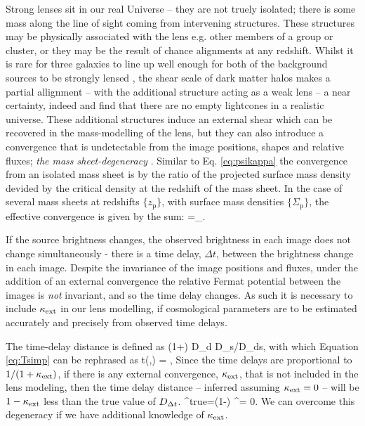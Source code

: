 \documentclass[useAMS,usenatbib]{mn2e}
\begin{document}
Strong lenses sit in our real Universe -- they are not truely isolated;
there is some mass along the line of sight coming from intervening structures.
These structures may be physically associated with the lens e.g. other members
of a group or cluster, or they may be the result of chance alignments at any redshift. 
Whilst it is rare for three galaxies to line up well enough for both of the background sources
to be strongly lensed \citep{gavazzi2008,collett2012}, the shear scale of dark matter halos
makes a partial allignment -- with the additional structure acting as a weak lens -- 
a near certainty, indeed \citet{valewhite2003} and \citet{hilbert2007} find that there
are no empty lightcones in a realistic universe. These additional structures induce an external shear
which can be recovered in the mass-modelling of the lens, but they can also introduce a convergence that
is undetectable from the image positions, shapes and relative fluxes; {\it the mass sheet-degeneracy} \citep[see e.g.][for details]{Falco1985,Schneider2006}. Similar to Eq. \ref{eq:psikappa} the convergence from an isolated mass sheet is by the ratio of the projected surface mass density devided by the critical density at the redshift of the mass sheet.
In the case of several mass sheets at redshifts $\{z_{\mathrm{p}}\}$, with surface mass densities $\{\Sigma_{\mathrm{p}}\}$, the effective convergence is given by the  sum:
\be \label{eq:kappasum}
\kappax=\sum_{}.
\ee

If the source brightness changes, the observed brightness in each image does not change
simultaneously - there is a time delay, $\Delta t$, between the brightness change in
each image. Despite the invariance of the image positions and fluxes, under the addition
of an external convergence the relative Fermat potential between the images is {\it not}
invariant, and so the time delay changes. As such it is necessary to include $\kappa_{\rm ext}$
in our lens modelling, if cosmological parameters are to be estimated accurately and
precisely \citep{suyu2010} from observed time delays.

The time-delay distance is defined as
\be \label{eq:dt}
\Dt \equiv (1+\zd) D_{\rm d} D_{\rm s}/D_{\rm ds},
\ee
with which Equation \ref{eq:Tsimp} can be rephrased as
\be
\Delta t(\bmath{\theta},\bmath{\beta})  =  ,
\ee 
Since the time delays are proportional to $1/ (1+ \kappa_{\rm ext})$, if there is any external convergence, $\kappa_{\rm ext}$, that is not included in the lens
modeling, then the time delay distance -- inferred assuming $\kappa_{\rm ext} = 0$ -- will be
$1-\kappa_{\rm ext}$ less than the true value of $D_{\Delta t}$.
\be 
\label{eq:MassSheet:H0bias}
\Dt^{\rm{true}}=(1-\kappax) \Dt^{{\kappax = 0}}.
\ee
We can overcome this degeneracy if we have additional knowledge of $\kappa_{\rm ext}$.
\end{document}
